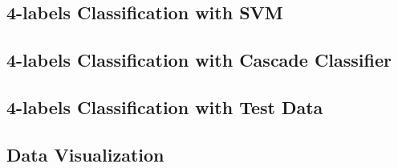 


\subsection{4-labels Classification with SVM}


\subsection{4-labels Classification with Cascade Classifier}


\subsection{4-labels Classification with Test Data}



\subsection{Data Visualization}
